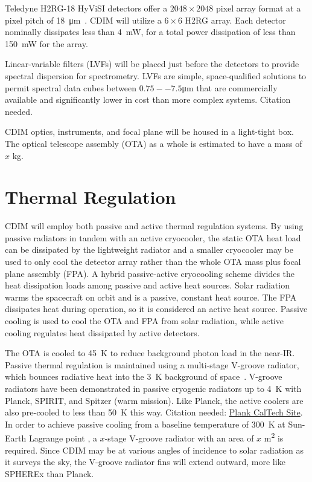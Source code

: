 \documentclass{ws-jai}
\begin{document}
Teledyne H2RG-18 HyViSI detectors offer a $2048\times2048$ pixel array format at a pixel pitch of \SI{18}{\micro\meter}~\cite{teledyneH2RG}.
CDIM will utilize a $6\times6$ H2RG array.
Each detector nominally dissipates less than \SI{4}{\milli\watt}, for a total power dissipation of less than \SI{150}{\milli\watt} for the array.

Linear-variable filters (LVFs) will be placed just before the detectors to provide spectral dispersion for spectrometry.
LVFs are simple, space-qualified solutions to permit spectral data cubes between $0.75--7.5$\si{\micro\meter} that are commercially available and significantly lower in cost than more complex systems. {\color{red}Citation needed.}

CDIM optics, instruments, and focal plane will be housed in a light-tight box.
The optical telescope assembly (OTA) as a whole is estimated to have a {\color{red}mass of $x$ \si{\kilo\gram}}.

\section{Thermal Regulation}
\label{sec:thermal}
CDIM will employ both passive and active thermal regulation systems.
By using passive radiators in tandem with an active cryocooler, the static OTA heat load can be dissipated by the lightweight radiator and a smaller cryocooler may be used to only cool the detector array rather than the whole OTA mass plus focal plane assembly (FPA).
A hybrid passive-active cryocooling scheme divides the heat dissipation loads among passive and active heat sources.
Solar radiation warms the spacecraft on orbit and is a passive, constant heat source.
The FPA dissipates heat during operation, so it is considered an active heat source.
Passive cooling is used to cool the OTA and FPA from solar radiation, while active cooling regulates heat dissipated by active detectors.

The OTA is cooled to \SI{45}{\kelvin} to reduce background photon load in the near-IR.\@
Passive thermal regulation is maintained using a multi-stage V-groove radiator, which bounces radiative heat into the \SI{3}{\kelvin} background of space~\cite{bard_1987}.
V-groove radiators have been demonstrated in passive cryogenic radiators up to \SI{4}{\kelvin} with Planck, SPIRIT, and Spitzer (warm mission).\@
Like Planck, the active coolers are also pre-cooled to less than \SI{50}{\kelvin} this way. {\color{red}Citation needed: \href{http://planck.caltech.edu/spacecraft.html}{Plank CalTech Site}.}
In order to achieve passive cooling from a baseline temperature of \SI{300}{\kelvin} at Sun-Earth Lagrange point \Ltwo, a {\color{red}$x$-stage} V-groove radiator with an {\color{red}area of $x$ \si{\meter\squared}} is required.
{\color{red}Since CDIM may be at various angles of incidence to solar radiation as it surveys the sky, the V-groove radiator fins will extend outward, more like SPHEREx than Planck}.
\end{document}

